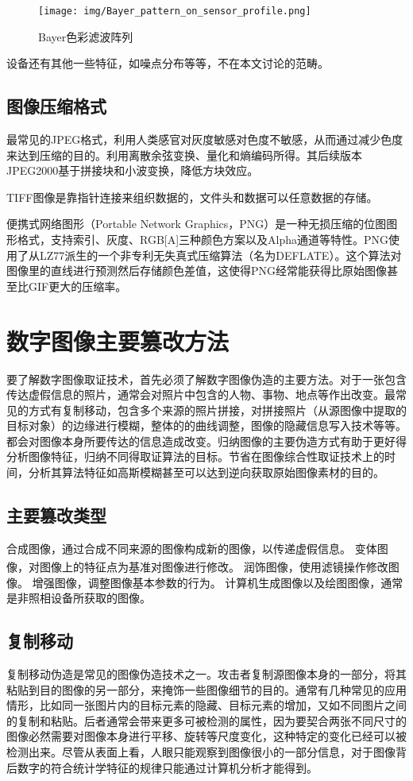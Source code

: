 \documentclass[a4paper, 10pt, notitlepage]{report}
\newcommand{\supercite}[1]{\textsuperscript{\cite{#1}}}
\begin{document}
			\begin{figure}[htp]
				\centering
				\texttt{[image: img/Bayer\_pattern\_on\_sensor\_profile.png]}
				\caption{Bayer色彩滤波阵列}
				\label{fig-bayer}
			\end{figure}

			设备还有其他一些特征，如噪点分布等等，不在本文讨论的范畴。
		
		\subsection{图像压缩格式}
			最常见的JPEG格式，利用人类感官对灰度敏感对色度不敏感，从而通过减少色度来达到压缩的目的。利用离散余弦变换、量化和熵编码所得。其后续版本JPEG2000基于拼接块和小波变换，降低方块效应。

			TIFF图像是靠指针连接来组织数据的，文件头和数据可以任意数据的存储。

			便携式网络图形（Portable Network Graphics，PNG）是一种无损压缩的位图图形格式，支持索引、灰度、RGB[A]三种颜色方案以及Alpha通道等特性。PNG使用了从LZ77派生的一个非专利无失真式压缩算法（名为DEFLATE）。这个算法对图像里的直线进行预测然后存储颜色差值，这使得PNG经常能获得比原始图像甚至比GIF更大的压缩率。

	\section{数字图像主要篡改方法}
		要了解数字图像取证技术，首先必须了解数字图像伪造的主要方法。对于一张包含传达虚假信息的照片，通常会对照片中包含的人物、事物、地点等作出改变。最常见的方式有复制移动，包含多个来源的照片拼接，对拼接照片（从源图像中提取的目标对象）的边缘进行模糊，整体的的曲线调整，图像的隐藏信息写入技术等等。都会对图像本身所要传达的信息造成改变。归纳图像的主要伪造方式有助于更好得分析图像特征，归纳不同得取证算法的目标。节省在图像综合性取证技术上的时间，分析其算法特征如高斯模糊甚至可以达到逆向获取原始图像素材的目的。

		\subsection{主要篡改类型}
			合成图像，通过合成不同来源的图像构成新的图像，以传递虚假信息。
			变体图像，对图像上的特征点为基准对图像进行修改\supercite{surveyof}。
			润饰图像，使用滤镜操作修改图像。
			增强图像，调整图像基本参数的行为。
			计算机生成图像以及绘图图像，通常是非照相设备所获取的图像。
		
		\subsection{复制移动}
			复制移动伪造是常见的图像伪造技术之一。攻击者复制源图像本身的一部分，将其粘贴到目的图像的另一部分，来掩饰一些图像细节的目的。通常有几种常见的应用情形，比如同一张图片内的目标元素的隐藏、目标元素的增加，又如不同图片之间的复制和粘贴。后者通常会带来更多可被检测的属性，因为要契合两张不同尺寸的图像必然需要对图像本身进行平移、旋转等尺度变化，这种特定的变化已经可以被检测出来。尽管从表面上看，人眼只能观察到图像很小的一部分信息，对于图像背后数字的符合统计学特征的规律只能通过计算机分析才能得到。
\end{document}
